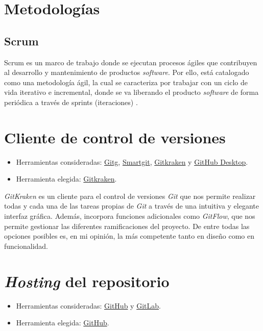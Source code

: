 
\section{Metodologías}

\subsection{Scrum}

Scrum es un marco de trabajo donde se ejecutan procesos ágiles que
contribuyen al desarrollo y mantenimiento de productos \emph{software}.
Por ello, está catalogado como una metodología ágil, la cual se
caracteriza por trabajar con un ciclo de vida iterativo e incremental,
donde se va liberando el producto \emph{software} de forma periódica a
través de {sprints} (iteraciones) \cite{scrum:guide}.

\section{Cliente de control de versiones}

\begin{itemize}
\tightlist
\item
  Herramientas consideradas:
  \href{https://wiki.gnome.org/Apps/Gitg/}{Gitg},
  \href{https://www.syntevo.com/smartgit/}{Smartgit},
  \href{https://www.gitkraken.com/}{Gitkraken} y
  \href{https://desktop.github.com/}{GitHub Desktop}.
\item
  Herramienta elegida: \href{https://www.gitkraken.com/}{Gitkraken}.
\end{itemize}

\emph{GitKraken} es un cliente para el control de versiones \emph{Git} que nos
permite realizar todas y cada una de las tareas propias de \emph{Git} a
través de una intuitiva y elegante interfaz gráfica. Además, incorpora
funciones adicionales como \emph{GitFlow}, que nos permite gestionar las
diferentes ramificaciones del proyecto. De entre todas las opciones
posibles es, en mi opinión, la más competente tanto en diseño como en
funcionalidad.

\section{\emph{Hosting} del repositorio}

\begin{itemize}
\tightlist
\item
  Herramientas consideradas: \href{https://github.com/}{GitHub} y
  \href{https://gitlab.com/}{GitLab}.
\item
  Herramienta elegida: \href{https://github.com/}{GitHub}.
\end{itemize}

